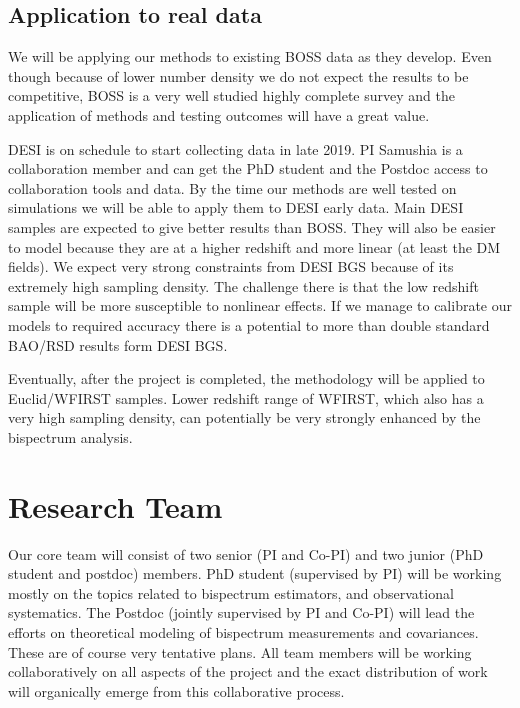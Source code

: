 \subsection*{Application to real data}

We will be applying our methods to existing BOSS data as they develop. Even
though because of lower number density we do not expect the results to be
competitive, BOSS is a very well studied highly complete survey and the
application of methods and testing outcomes will have a great value. 

DESI is on schedule to start collecting data in late 2019. PI Samushia is a
collaboration member and can get the PhD student and the Postdoc access to
collaboration tools and data. By the time our methods are well tested on
simulations we will be able to apply them to DESI early data. Main DESI samples
are expected to give better results than BOSS. They will also be easier to
model because they are at a higher redshift and more linear (at least the DM
fields). We expect very strong constraints from DESI BGS because of its
extremely high sampling density. The challenge there is that the low redshift
sample will be more susceptible to nonlinear effects. If we manage to calibrate
our models to required accuracy there is a potential to more than double
standard BAO/RSD results form DESI BGS.

Eventually, after the project is completed, the methodology will be applied to
Euclid/WFIRST samples. Lower redshift range of WFIRST, which also has a very
high sampling density, can potentially be very strongly enhanced by the
bispectrum analysis.

\section{Research Team}

Our core team will consist of two senior (PI and Co-PI) and two junior (PhD
student and postdoc) members. PhD student (supervised by PI) will be working
mostly on the topics related to bispectrum estimators, and observational
systematics. The Postdoc (jointly supervised by PI and Co-PI) will lead the
efforts on theoretical modeling of bispectrum measurements and covariances.
These are of course very tentative plans. All team members will be working
collaboratively on all aspects of the project and the exact distribution of
work will organically emerge from this collaborative process. 

